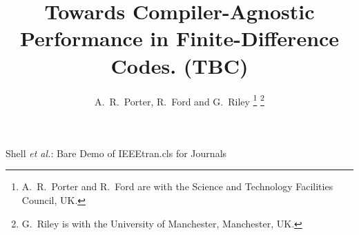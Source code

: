 \documentclass[journal]{IEEEtran}
\begin{document}
%
\title{Towards Compiler-Agnostic Performance in Finite-Difference Codes. (TBC)}
%
%
%

\author{A.~R.~Porter, R.~Ford and G.~Riley%
\thanks{A.~R.~Porter and R.~Ford are with the Science and Technology Facilities Council, UK.}%
\thanks{G.~Riley is with the University of Manchester, Manchester, UK.}%
}

% 
%



%
{Shell \MakeLowercase{\textit{et al.}}: Bare Demo of IEEEtran.cls for Journals}
% 
\end{document}
